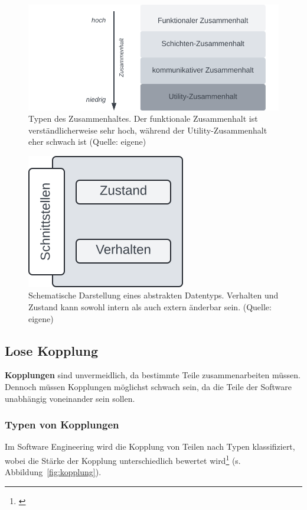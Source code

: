 \begin{figure}
    \centering
    \includegraphics[scale=0.4]{part two/Objektorientierter Entwurf/img/zusammenhalt}
    \caption{Typen des Zusammenhaltes. Der funktionale Zusammenhalt ist verständlicherweise sehr hoch, während der Utility-Zusammenhalt eher schwach ist (Quelle: eigene)}
    \label{fig:zusammenhalt}
\end{figure}


\begin{figure}
    \centering
    \includegraphics[scale=0.4]{part two/Objektorientierter Entwurf/img/adt}
    \caption{Schematische Darstellung eines abstrakten Datentyps. Verhalten und Zustand kann sowohl intern als auch extern änderbar sein.  (Quelle: eigene)}
    \label{fig:adt}
\end{figure}

\subsection{Lose Kopplung}\label{subsec:lose-kopplung}
\textbf{Kopplungen} sind unvermeidlich, da bestimmte Teile zusammenarbeiten müssen.\\
Dennoch müssen Kopplungen möglichst schwach sein, da die Teile der Software unabhängig voneinander sein sollen.

\subsubsection*{Typen von Kopplungen}
Im Software Engineering wird die Kopplung von Teilen nach Typen klassifiziert, wobei die Stärke der Kopplung unterschiedlich bewertet wird\footnote{
\cite[33 ff.]{Mye75}
} (s. Abbildung~\ref{fig:kopplung}).

